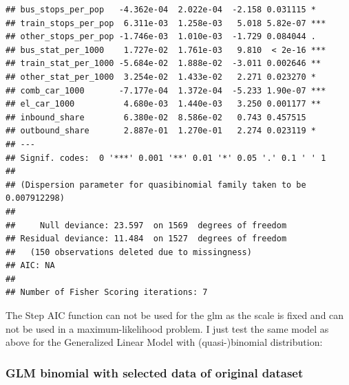 \documentclass[
]{article}
\begin{document}
\begin{verbatim}
## bus_stops_per_pop   -4.362e-04  2.022e-04  -2.158 0.031115 *  
## train_stops_per_pop  6.311e-03  1.258e-03   5.018 5.82e-07 ***
## other_stops_per_pop -1.746e-03  1.010e-03  -1.729 0.084044 .  
## bus_stat_per_1000    1.727e-02  1.761e-03   9.810  < 2e-16 ***
## train_stat_per_1000 -5.684e-02  1.888e-02  -3.011 0.002646 ** 
## other_stat_per_1000  3.254e-02  1.433e-02   2.271 0.023270 *  
## comb_car_1000       -7.177e-04  1.372e-04  -5.233 1.90e-07 ***
## el_car_1000          4.680e-03  1.440e-03   3.250 0.001177 ** 
## inbound_share        6.380e-02  8.586e-02   0.743 0.457515    
## outbound_share       2.887e-01  1.270e-01   2.274 0.023119 *  
## ---
## Signif. codes:  0 '***' 0.001 '**' 0.01 '*' 0.05 '.' 0.1 ' ' 1
## 
## (Dispersion parameter for quasibinomial family taken to be 0.007912298)
## 
##     Null deviance: 23.597  on 1569  degrees of freedom
## Residual deviance: 11.484  on 1527  degrees of freedom
##   (150 observations deleted due to missingness)
## AIC: NA
## 
## Number of Fisher Scoring iterations: 7
\end{verbatim}

The Step AIC function can not be used for the glm as the scale is fixed
and can not be used in a maximum-likelihood problem. I just test the
same model as above for the Generalized Linear Model with
(quasi-)binomial distribution:

\hypertarget{glm-binomial-with-selected-data-of-original-dataset}{%
\subsubsection{GLM binomial with selected data of original
dataset}\label{glm-binomial-with-selected-data-of-original-dataset}}
\end{document}
